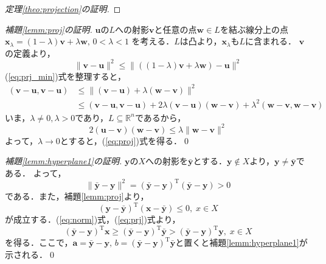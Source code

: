 \documentclass[dvipdfmx]{jsreport}
\begin{document}
\begin{proof}[定理\ref{theo:projection}の証明]

\end{proof}

\begin{proof}[補題\ref{lemm:proj}の証明]
  $\bm{u}$の$L$への射影$\bm{v}$と任意の点$\bm{w} \in L$を結ぶ線分上の点
  $\bm{x}_{\lambda} = (1 - \lambda)\bm{v} + \lambda \bm{w}, \, 0 < \lambda < 1$
  を考える．$L$は凸より，$\bm{x}_{\lambda}$も$L$に含まれる．
  $\bm{v}$の定義より，
  \begin{equation}\label{eq:prj_min}
    \|\bm{v} - \bm{u}\|^2 \leq \|((1 - \lambda)\bm{v} + \lambda \bm{w}) - \bm{u} \|^2
  \end{equation}
  (\ref{eq:prj_min})式を整理すると，
  \begin{align}
    (\bm{v}- \bm{u}, \bm{v}- \bm{u}) &\leq \|(\bm{v} - \bm{u}) + \lambda(\bm{w} - \bm{v}) \|^2 \nonumber \\
    &\leq (\bm{v}- \bm{u}, \bm{v}- \bm{u}) + 2\lambda(\bm{v} - \bm{u})(\bm{w} - \bm{v}) + \lambda^2(\bm{w} - \bm{v}, \bm{w} - \bm{v}) \nonumber
  \end{align}
  いま，$\lambda \neq 0, \lambda > 0$であり，$L \subseteq \mathbb{R}^n$であるから，
  \begin{equation}
    2(\bm{u} - \bm{v})(\bm{w} - \bm{v}) \leq \lambda \|\bm{w} - \bm{v}\|^2 \nonumber
  \end{equation}
  よって，$\lambda \rightarrow 0$とすると，(\ref{eq:proj})式を得る．\qed
\end{proof}

\begin{proof}[補題\ref{lemm:hyperplane1}の証明]
  $\bm{y}$の$X$への射影を$\bar{\bm{y}}$とする．$\bm{y} \notin X$より，$\bm{y} \neq \bar{\bm{y}}$である．
  よって，
  \begin{equation}\label{eq:norm}
    \|\bar{\bm{y}} - \bm{y}\|^2 = (\bar{\bm{y}} - \bm{y})^{\mathrm{T}}(\bar{\bm{y}} - \bm{y}) > 0
  \end{equation}
  である．また，補題\ref{lemm:proj}より，
  \begin{equation}\label{eq:prj}
    (\bm{y} - \bar{\bm{y}})^{\mathrm{T}}(\bm{x} - \bar{\bm{y}}) \leq 0, \; x \in X
  \end{equation}
  が成立する．(\ref{eq:norm})式，(\ref{eq:prj})式より，
  \begin{equation}
    (\bar{\bm{y}} - \bm{y})^{\mathrm{T}} \bm{x} \geq (\bar{\bm{y}} - \bm{y})^{\mathrm{T}} \bar{\bm{y}} > (\bar{\bm{y}} - \bm{y})^{\mathrm{T}} \bm{y}, \; x \in X \nonumber
  \end{equation}
  を得る．ここで，$\bm{a} = \bar{\bm{y}} - \bm{y}, \, b = (\bar{\bm{y}} - \bm{y})^{\mathrm{T}} \bar{\bm{y}}$と置くと補題\ref{lemm:hyperplane1}が示される．\qed
\end{proof}
\end{document}
